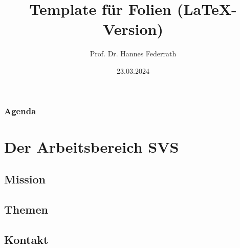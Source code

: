 \documentclass[t,aspectratio=169]{beamer}
\title{Template für Folien (LaTeX-Version)}
\author[Federrath]{Prof. Dr. Hannes Federrath}
\date{23.03.2024} %
\begin{document}
\begin{frame}
	\maketitle
\end{frame}

\begin{frame}
	\frametitle{Agenda}
	\tableofcontents
\end{frame}

\section{Der Arbeitsbereich SVS} %
\subsection{Mission} %
\subsection{Themen} %
\subsection{Kontakt} %
\end{document}
